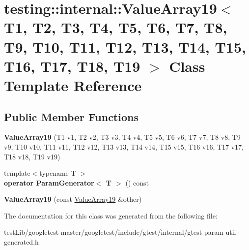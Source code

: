 \hypertarget{classtesting_1_1internal_1_1ValueArray19}{}\section{testing\+:\+:internal\+:\+:Value\+Array19$<$ T1, T2, T3, T4, T5, T6, T7, T8, T9, T10, T11, T12, T13, T14, T15, T16, T17, T18, T19 $>$ Class Template Reference}
\label{classtesting_1_1internal_1_1ValueArray19}
\subsection*{Public Member Functions}
\begin{DoxyCompactItemize}
\item 
\mbox{\label{classtesting_1_1internal_1_1ValueArray19_a1ffcdacd1ffb1d6718187a66458c09e2}} 
{\bfseries Value\+Array19} (T1 v1, T2 v2, T3 v3, T4 v4, T5 v5, T6 v6, T7 v7, T8 v8, T9 v9, T10 v10, T11 v11, T12 v12, T13 v13, T14 v14, T15 v15, T16 v16, T17 v17, T18 v18, T19 v19)
\item 
\mbox{\label{classtesting_1_1internal_1_1ValueArray19_a8ddd6c1de46e25310cf844895c7c8cf6}} 
{\footnotesize template$<$typename T $>$ }\\{\bfseries operator Param\+Generator$<$ T $>$} () const
\item 
\mbox{\label{classtesting_1_1internal_1_1ValueArray19_a1029ebc5d39633e2fb278e051d0ec1d0}} 
{\bfseries Value\+Array19} (const \hyperlink{classtesting_1_1internal_1_1ValueArray19}{Value\+Array19} \&other)
\end{DoxyCompactItemize}


The documentation for this class was generated from the following file\+:\begin{DoxyCompactItemize}
\item 
test\+Lib/googletest-\/master/googletest/include/gtest/internal/gtest-\/param-\/util-\/generated.\+h\end{DoxyCompactItemize}
